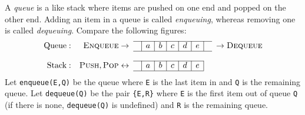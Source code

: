 \documentclass[11pt,a4paper]{article}
\author{Christian Rinderknecht}
\date{27 April 2007}
\begin{document}
\maketitle

\thispagestyle{empty}

\noindent A \emph{queue} is a like stack where items are pushed on one
end and popped on the other end. Adding an item in a queue is called
\emph{enqueuing}, whereas removing one is called
\emph{dequeuing}. Compare the following figures:
\[
\begin{array}{rr@{\;}cc|c|c|c|c|c|cc@{\;}l}
\cline{4-10}
\text{Queue}: & \textsc{Enqueue} & \rightarrow & & a & b & c & d & e &
& \rightarrow & \textsc{Dequeue}\\
\cline{4-10}\\
\cline{4-9}
\text{Stack}: & \textsc{Push}, \textsc{Pop} & \leftrightarrow & & a &
b & c & d & e &&&\\
\cline{4-9}
\end{array}
\]
\noindent Let \texttt{enqueue(E,Q)} be the queue where \texttt{E} is
the last item in and \texttt{Q} is the remaining queue. Let
\texttt{dequeue(Q)} be the pair \texttt{\{E,R\}} where \texttt{E} is
the first item out of queue \texttt{Q} (if there is none,
\texttt{dequeue(Q)} is undefined) and \texttt{R} is the remaining
queue.

\bigskip



\end{document}
